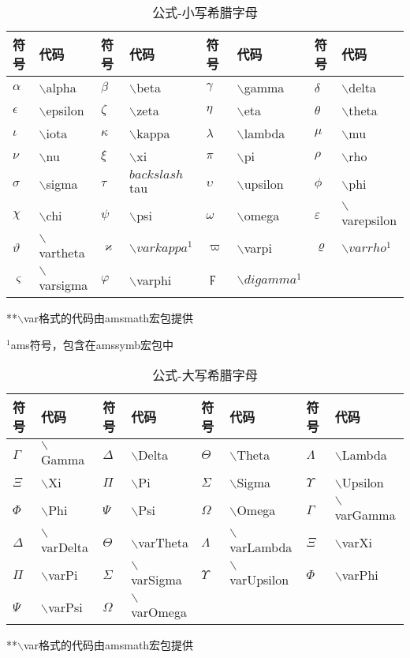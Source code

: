 \documentclass[UTF8,fontset=ubuntu]{ctexart}
\begin{document}
\begin{table}
\begin{tabular}{l l l l l l l l}
	\hline
	符号 & 代码 & 符号 & 代码 & 符号 & 代码 & 符号 & 代码\\
	\hline
	$\alpha$ & $\backslash$alpha & $\beta$ & $\backslash$beta & $\gamma$ & $\backslash$gamma & $\delta$ & $\backslash$delta\\
	$\epsilon$ & $\backslash$epsilon & $\zeta$ & $\backslash$zeta & $\eta$ & $\backslash$eta & $\theta$ & $\backslash$theta\\
	$\iota$ & $\backslash$iota & $\kappa$ & $\backslash$kappa & $\lambda$ & $\backslash$lambda & $\mu$ & $\backslash$mu\\
	$\nu$ & $\backslash$nu & $\xi$ & $\backslash$xi & $\pi$ & $\backslash$pi & $\rho$ & $\backslash$rho\\
	$\sigma$ & $\backslash$sigma & $\tau$ & $backslash$tau & $\upsilon$ & $\backslash$upsilon & $\phi$ & $\backslash$phi\\
	$\chi$ & $\backslash$chi & $\psi$ & $\backslash$psi & $\omega$ & $\backslash$omega & $\varepsilon$ & $\backslash$varepsilon\\
	$\vartheta$ & $\backslash$vartheta & $\varkappa$ & $\backslash varkappa^1$ & $\varpi$ & $\backslash$varpi & $\varrho$ & $\backslash varrho^1$\\
	$\varsigma$ & $\backslash$varsigma & $\varphi$ & $\backslash$varphi & $\digamma$ & $\backslash digamma^1$\\
	\hline
\end{tabular}
**$\backslash$var格式的代码由amsmath宏包提供\par
${}^1$\hspace{1mm}ams符号，包含在amssymb宏包中
\caption{公式-小写希腊字母}
\end{table}
\begin{table}
\begin{tabular}{l l l l l l l l}
	\hline
	符号 & 代码 & 符号 & 代码 & 符号 & 代码 & 符号 & 代码\\
	\hline
	$\Gamma$ & $\backslash$Gamma & $\Delta$ & $\backslash$Delta & $\Theta$ & $\backslash$Theta & $\Lambda$ & $\backslash$Lambda\\
	$\Xi$ & $\backslash$Xi & $\Pi$ & $\backslash$Pi & $\Sigma$ & $\backslash$Sigma & $\Upsilon$ & $\backslash$Upsilon\\
	$\Phi$ & $\backslash$Phi & $\Psi$ & $\backslash$Psi & $\Omega$ & $\backslash$Omega & $\varGamma$ & $\backslash$varGamma\\
	$\varDelta$ & $\backslash$varDelta & $\varTheta$ & $\backslash$varTheta & $\varLambda$ & $\backslash$varLambda & $\varXi$ & $\backslash$varXi\\
	$\varPi$ & $\backslash$varPi & $\varSigma$ & $\backslash$varSigma & $\varUpsilon$ & $\backslash$varUpsilon & $\varPhi$ & $\backslash$varPhi\\
	$\varPsi$ & $\backslash$varPsi & $\varOmega$ & $\backslash$varOmega\\
	\hline
\end{tabular}
**$\backslash$var格式的代码由amsmath宏包提供
\caption{公式-大写希腊字母}
\end{table}
\end{document}
